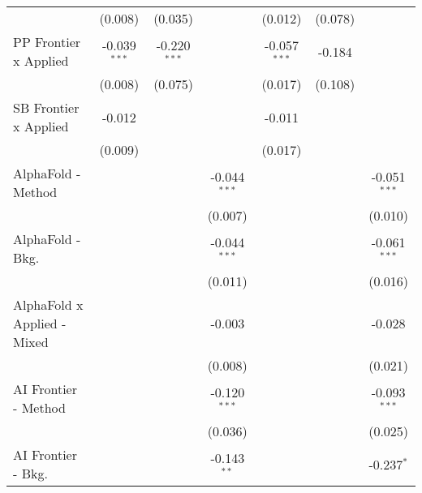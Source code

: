 \begin{tabular}{lcccccc}
                                               & (0.008)        & (0.035)        &                & (0.012)        & (0.078)        &   \\   
   PP Frontier x Applied                       & -0.039$^{***}$ & -0.220$^{***}$ &                & -0.057$^{***}$ & -0.184         &   \\   
                                               & (0.008)        & (0.075)        &                & (0.017)        & (0.108)        &   \\   
   SB Frontier x Applied                       & -0.012         &                &                & -0.011         &                &   \\   
                                               & (0.009)        &                &                & (0.017)        &                &   \\   
   AlphaFold - Method                          &                &                & -0.044$^{***}$ &                &                & -0.051$^{***}$\\   
                                               &                &                & (0.007)        &                &                & (0.010)\\   
   AlphaFold - Bkg.                            &                &                & -0.044$^{***}$ &                &                & -0.061$^{***}$\\   
                                               &                &                & (0.011)        &                &                & (0.016)\\   
   AlphaFold x Applied - Mixed                 &                &                & -0.003         &                &                & -0.028\\   
                                               &                &                & (0.008)        &                &                & (0.021)\\   
   AI Frontier - Method                        &                &                & -0.120$^{***}$ &                &                & -0.093$^{***}$\\   
                                               &                &                & (0.036)        &                &                & (0.025)\\   
   AI Frontier - Bkg.                          &                &                & -0.143$^{**}$  &                &                & -0.237$^{*}$\\   

\end{tabular}

